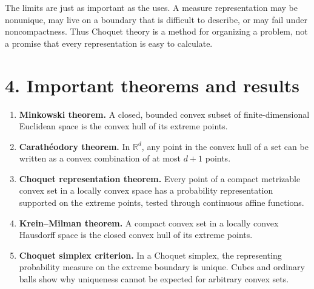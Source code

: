 The limits are just as important as the uses. A measure representation may be nonunique, may live on a boundary that is difficult to describe, or may fail under noncompactness. Thus Choquet theory is a method for organizing a problem, not a promise that every representation is easy to calculate.

\section*{4. Important theorems and results}
\begin{enumerate}[leftmargin=*,itemsep=0.35em]

\item \textbf{Minkowski theorem.} A closed, bounded convex subset of finite-dimensional Euclidean space is the convex hull of its extreme points. \cite{choquet_theory_ref5}

\item \textbf{Carathéodory theorem.} In $\mathbb R^d$, any point in the convex hull of a set can be written as a convex combination of at most $d+1$ points. \cite{choquet_theory_ref5}

\item \textbf{Choquet representation theorem.} Every point of a compact metrizable convex set in a locally convex space has a probability representation supported on the extreme points, tested through continuous affine functions. \cite{choquet_theory_ref1}

\item \textbf{Krein--Milman theorem.} A compact convex set in a locally convex Hausdorff space is the closed convex hull of its extreme points. \cite{choquet_theory_ref2}

\item \textbf{Choquet simplex criterion.} In a Choquet simplex, the representing probability measure on the extreme boundary is unique. Cubes and ordinary balls show why uniqueness cannot be expected for arbitrary convex sets. \cite{choquet_theory_ref1}
\end{enumerate}

\theoryapplications
{}

